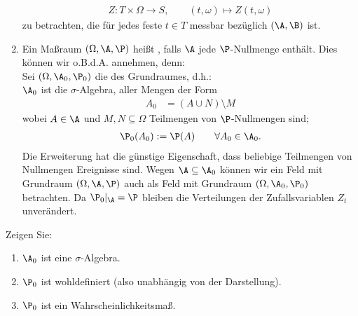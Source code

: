 \begin{bemerkungnr}
\begin{enumerate}[label=(\arabic*)]
		\begin{align*}
			Z:T\times\Omega\to S,\qquad (t,\omega)\mapsto Z(t,\omega)
		\end{align*}
		zu betrachten, die für jedes feste $t\in T$ messbar bezüglich $(\A,\B)$ ist.
		\item Ein Maßraum $(\Omega,\A,\P)$ heißt , falls $\A$ jede $\P$-Nullmenge enthält.\label{item:bemerkung1.3.2(7)}
		Dies können wir o.B.d.A. annehmen, denn:\\
		Sei $(\Omega,\A_0,\P_0)$ die  des Grundraumes, d.h.: \\
		$\A_0$ ist die $\sigma$-Algebra, aller Mengen der Form
		\begin{align*}
			A_0&=(A\cup N)\setminus M
		\end{align*}
		wobei $A\in\A$ und $M,N\subseteq\Omega$ Teilmengen von $\P$-Nullmengen sind;
		\begin{align*}
			\P_0(A_0):=\P(A)\qquad\forall A_0\in\A_0.
		\end{align*}
		Die Erweiterung hat die günstige Eigenschaft, dass beliebige Teilmengen von Nullmengen Ereignisse sind.
		Wegen $\A\subseteq\A_0$ können wir ein Feld mit Grundraum $(\Omega,\A,\P)$ auch als Feld mit Grundraum $(\Omega,\A_0,\P_0)$ betrachten.
		Da $\P_0|_\A=\P$ bleiben die Verteilungen der Zufallsvariablen $Z_t$ unverändert.
	\end{enumerate}
\end{bemerkungnr}

\begin{aufgabenr}\label{aufg:3}\enter
	Zeigen Sie:
	\begin{enumerate}
		\item $\A_0$ ist eine $\sigma$-Algebra.
		\item $\P_0$ ist wohldefiniert (also unabhängig von der Darstellung).
		\item $\P_0$ ist ein Wahrscheinlichkeitsmaß.
	\end{enumerate}
\end{aufgabenr}

